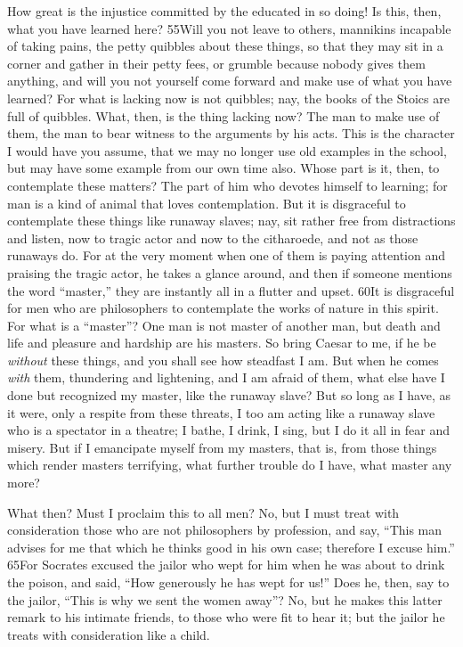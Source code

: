 How great is the injustice committed by the educated in so doing! Is this, then, what you have learned here? 55Will you not leave to others, mannikins incapable of taking pains, the petty quibbles about these things, so that they may sit in a corner and gather in their petty fees, or grumble because nobody gives them anything, and will you not yourself come forward and make use of what you have learned? For what is lacking now is not quibbles; nay, the books of the Stoics are full of quibbles. What, then, is the thing lacking now? The man to make use of them, the man to bear witness to the arguments by his acts. This is the character I would have you assume, that we may no longer use old examples in the school, but may have some example from our own time also. Whose part is it, then, to contemplate these matters? The part of him who devotes himself to learning; for man is a kind of animal that loves contemplation. But it is disgraceful to contemplate these things like runaway slaves; nay, sit rather free from distractions and listen, now to tragic actor and now to the citharoede, and not as those runaways do. For at the very moment when one of them is paying attention and praising the tragic actor, he takes a glance around, and then if someone mentions the word ``master,'' they are instantly all in a flutter and upset. 60It is disgraceful for men who are philosophers to contemplate the works of nature in this spirit. For what is a ``master''? One man is not master of another man, but death and life and pleasure and hardship are his masters. So bring Caesar to me, if he be \emph{without} these things, and you shall see how steadfast I am. But when he comes \emph{with} them, thundering and lightening, and I am afraid of them, what else have I done but recognized my master, like the runaway slave? But so long as I have, as it were, only a respite from these threats, I too am acting like a runaway slave who is a spectator in a theatre; I bathe, I drink, I sing, but I do it all in fear and misery. But if I emancipate myself from my masters, that is, from those things which render masters terrifying, what further trouble do I have, what master any more?

What then? Must I proclaim this to all men? No, but I must treat with consideration those who are not philosophers by profession, and say, ``This man advises for me that which he thinks good in his own case; therefore I excuse him.'' 65For Socrates excused the jailor who wept for him when he was about to drink the poison, and said, ``How generously he has wept for us!'' Does he, then, say to the jailor, ``This is why we sent the women away''? No, but he makes this latter remark to his intimate friends, to those who were fit to hear it; but the jailor he treats with consideration like a child.

